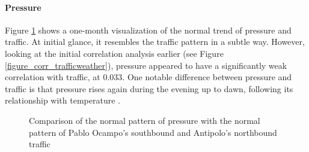 \paragraph{Pressure}

Figure \ref{figure_traffic_vs_pressure} shows a one-month visualization of the normal trend of pressure and traffic. At initial glance, it resembles the traffic pattern in a subtle way. However, looking at the initial correlation analysis earlier (see Figure \ref{figure_corr_trafficweather}), pressure appeared to have a significantly weak correlation with traffic, at 0.033. One notable difference between pressure and traffic is that pressure rises again during the evening up to dawn, following its relationship with temperature .


\begin{figure}[h] 
\centering
    \centering
      \captionsetup{justification=centering}
    \hfill
    \caption{Comparison of the normal pattern of pressure with the normal pattern of Pablo Ocampo’s southbound and Antipolo’s northbound traffic}

    \label{figure_traffic_vs_pressure}
\end{figure}


